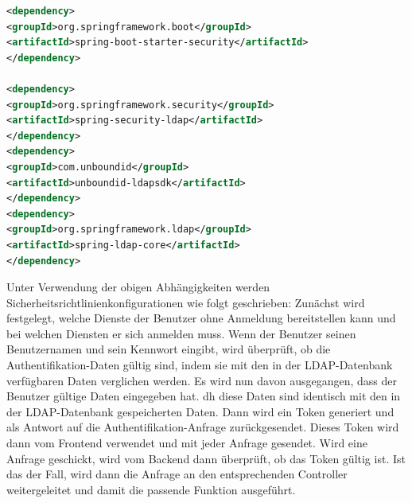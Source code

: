 \documentclass[apaper4,12p]{scrartcl}
\begin{document}
\begin{lstlisting}[language=XML,caption=pom.xml - security dependencies]
<dependency>
<groupId>org.springframework.boot</groupId>
<artifactId>spring-boot-starter-security</artifactId>
</dependency>

<dependency>
<groupId>org.springframework.security</groupId>
<artifactId>spring-security-ldap</artifactId>
</dependency>
<dependency>
<groupId>com.unboundid</groupId>
<artifactId>unboundid-ldapsdk</artifactId>
</dependency>
<dependency>
<groupId>org.springframework.ldap</groupId>
<artifactId>spring-ldap-core</artifactId>
</dependency>
\end{lstlisting}
Unter Verwendung der obigen Abhängigkeiten werden Sicherheitsrichtlinienkonfigurationen wie folgt geschrieben: Zunächst wird festgelegt, welche Dienste der Benutzer ohne Anmeldung bereitstellen kann und bei welchen Diensten er sich anmelden muss. Wenn der Benutzer seinen Benutzernamen und sein Kennwort eingibt, wird überprüft, ob die Authentifikation-Daten gültig sind, indem sie mit den in der LDAP-Datenbank verfügbaren Daten verglichen werden.
\newline
Es wird nun davon ausgegangen, dass der Benutzer gültige Daten eingegeben hat. dh diese Daten sind identisch mit den in der LDAP-Datenbank gespeicherten Daten. Dann wird ein Token generiert und als Antwort auf die Authentifikation-Anfrage zurückgesendet. Dieses Token wird dann vom Frontend verwendet und mit jeder Anfrage gesendet.
\newline
Wird eine Anfrage geschickt, wird vom Backend dann überprüft, ob das Token gültig ist. Ist das der Fall, wird dann die Anfrage an den entsprechenden Controller weitergeleitet und damit die passende Funktion ausgeführt.
\end{document}
